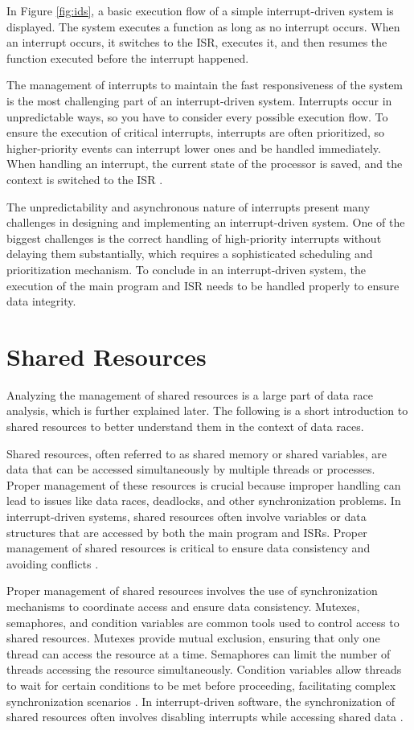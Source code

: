 \documentclass[
fancyheadings, %
%
%
]{stsreprt}
\begin{document}
{		In Figure \ref{fig:ids}, a basic execution flow of a simple interrupt-driven system is displayed. The system executes a function as long as no interrupt occurs. When an interrupt occurs, it switches to the \ac{ISR}, executes it, and then resumes the function executed before the interrupt happened.
		
		The management of interrupts to maintain the fast responsiveness of the system is the most challenging part of an interrupt-driven system. Interrupts occur in unpredictable ways, so you have to consider every possible execution flow. To ensure the execution of critical interrupts, interrupts are often prioritized, so higher-priority events can interrupt lower ones and be handled immediately. When handling an interrupt, the current state of the processor is saved, and the context is switched to the \ac{ISR} \cite{wang2020}.
		
		The unpredictability and asynchronous nature of interrupts present many challenges in designing and implementing an interrupt-driven system. One of the biggest challenges is the correct handling of high-priority interrupts without delaying them substantially, which requires a sophisticated scheduling and prioritization mechanism. 
		To conclude in an interrupt-driven system, the execution of the main program and \ac{ISR} needs to be handled properly to ensure data integrity. 
		
		\section{Shared Resources}
		Analyzing the management of shared resources is a large part of data race analysis, which is further explained later. The following is a short introduction to shared resources to better understand them in the context of data races.
		
		Shared resources, often referred to as shared memory or shared variables, are data that can be accessed simultaneously by multiple threads or processes. Proper management of these resources is crucial because improper handling can lead to issues like data races, deadlocks, and other synchronization problems. In interrupt-driven systems, shared resources often involve variables or data structures that are accessed by both the main program and \acp{ISR}. Proper management of shared resources is critical to ensure data consistency and avoiding conflicts \cite{herlihy2008}.
		
		Proper management of shared resources involves the use of synchronization mechanisms to coordinate access and ensure data consistency. Mutexes, semaphores, and condition variables are common tools used to control access to shared resources. Mutexes provide mutual exclusion, ensuring that only one thread can access the resource at a time. Semaphores can limit the number of threads accessing the resource simultaneously. Condition variables allow threads to wait for certain conditions to be met before proceeding, facilitating complex synchronization scenarios \cite{herlihy2008}. In interrupt-driven software, the synchronization of shared resources often involves disabling interrupts while accessing shared data \cite{chopra2019}.
		
}
\end{document}
